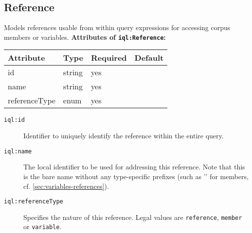 \documentclass[11pt]{article}
\newcommand{\iqlns}{iql:}
\newcommand{\iqlType}[1]{\texttt{\iqlns#1}}
\newcommand{\desc}[1]{\noindent#1\newline\medskip}
\newenvironment{attributes}[1]{
\noindent\textbf{Attributes of #1:}\newline\medskip
\begin{tabular}{|p{0.3\textwidth}|p{0.20\textwidth}|p{0.20\textwidth}|p{0.17\textwidth}|}
	\hline
	\textbf{Attribute} & \textbf{Type} & \textbf{Required} & \textbf{Default} \\ 
	\hline
	\hline
}{
\end{tabular}
}
\newcommand{\attribute}[4]{
	#1 & #2 & #3 & #4 \\
	\hline
}
\begin{document}
\subsection{Reference}
\label{sec:json-ld-reference}
\desc{Models references usable from within query expressions for accessing corpus members or variables.}
\begin{attributes}{\iqlType{Reference}}
	\attribute{id}{string}{yes}{}
	\attribute{name}{string}{yes}{}
	\attribute{referenceType}{enum}{yes}{}
\end{attributes}
\begin{description}
	\item[\iqlType{id}] Identifier to uniquely identify the reference within the entire query.
	\item[\iqlType{name}] The local identifier to be used for addressing this reference. Note that this is the bare name without any type-specific prefixes (such as '\textdollar' for members, cf. \cref{sec:variables-references}).
	\item[\iqlType{referenceType}] Specifies the nature of this reference. Legal values are \texttt{reference}, \texttt{member} or \texttt{variable}.
\end{description}

\end{document}
